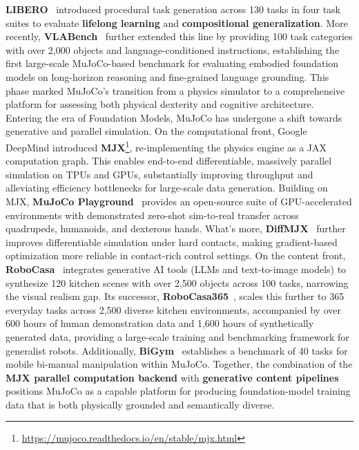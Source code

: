 \documentclass[acmsmall,screen,review,anonymous]{acmart}
\begin{document}
\textbf{LIBERO}~\cite{liu2023libero} introduced procedural task generation across 130 tasks in four task suites to evaluate \textbf{lifelong learning} and \textbf{compositional generalization}. 
More recently, \textbf{VLABench}~\cite{zhang2024vlabench} further extended this line by providing 100 task categories with over 2,000 objects and language-conditioned instructions, establishing the first large-scale MuJoCo-based benchmark for evaluating embodied foundation models on long-horizon reasoning and fine-grained language grounding. 
This phase marked MuJoCo's transition from a physics simulator to a comprehensive platform for assessing both physical dexterity and cognitive architecture.
Entering the era of Foundation Models, MuJoCo has undergone a shift towards generative and parallel simulation. 
On the computational front, Google DeepMind introduced \textbf{MJX}\footnote{\url{https://mujoco.readthedocs.io/en/stable/mjx.html}}, re-implementing the physics engine as a JAX computation graph. 
This enables end-to-end differentiable, massively parallel simulation on TPUs and GPUs, substantially improving throughput and alleviating efficiency bottlenecks for large-scale data generation. 
Building on MJX, \textbf{MuJoCo Playground}~\cite{deepmind2025playground} provides an open-source suite of GPU-accelerated environments with demonstrated zero-shot sim-to-real transfer across quadrupeds, humanoids, and dexterous hands. 
What's more, \textbf{DiffMJX}~\cite{paulus2025diffmjx} further improves differentiable simulation under hard contacts, making gradient-based optimization more reliable in contact-rich control settings.
On the content front, \textbf{RoboCasa}~\cite{nasiriany2024robocasa} integrates generative AI tools (LLMs and text-to-image models) to synthesize 120 kitchen scenes with over 2,500 objects across 100 tasks, narrowing the visual realism gap. 
Its successor, \textbf{RoboCasa365}~\cite{nasiriany2025robocasa}, scales this further to 365 everyday tasks across 2,500 diverse kitchen environments, accompanied by over 600 hours of human demonstration data and 1,600 hours of synthetically generated data, providing a large-scale training and benchmarking framework for generalist robots. 
Additionally, \textbf{BiGym}~\cite{chernyadev2024bigym} establishes a benchmark of 40 tasks for mobile bi-manual manipulation within MuJoCo. 
Together, the combination of the \textbf{MJX parallel computation backend} with \textbf{generative content pipelines} positions MuJoCo as a capable platform for producing foundation-model training data that is both physically grounded and semantically diverse.
\end{document}
